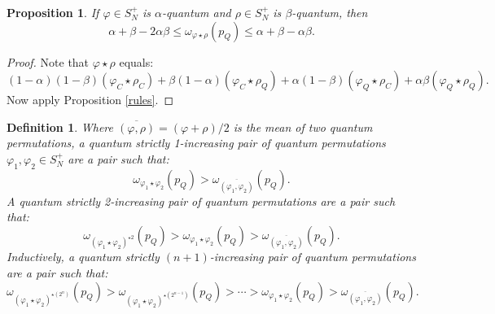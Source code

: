 \documentclass[12pt]{amsart}
\newtheorem{definition}[theorem]{Definition}
\newtheorem{proposition}[theorem]{Proposition}
\theoremstyle{remark}
\theoremstyle{remark}
\begin{document}
\begin{proposition}\label{alphabeta}
If $\varphi\in S_N^+$ is $\alpha$-quantum and $\rho\in S_N^+$ is $\beta$-quantum, then
$$\alpha+\beta-2\alpha\beta\leq \omega_{\varphi\star \rho}(p_Q)\leq \alpha+\beta-\alpha\beta.$$
\end{proposition}
\begin{proof}
Note that $\varphi\star \rho$ equals:
$$(1-\alpha)(1-\beta) (\varphi_C\star \rho_C)+\beta (1-\alpha)(\varphi_C\star \rho_Q)+\alpha(1-\beta)(\varphi_Q\star \rho_C)+\alpha\beta(\varphi_Q\star \rho_Q).$$
Now apply Proposition \ref{rules}.
\end{proof}
\begin{definition}
  Where $\overline{(\varphi,\rho)}=(\varphi+\rho)/2$ is the mean of two quantum permutations, a \emph{quantum strictly 1-increasing} pair of quantum permutations $\varphi_1,\varphi_2\in S_N^+$ are a pair such that:
  $$\omega_{\varphi_1\star\varphi_2}(p_Q)>\omega_{\overline{(\varphi_1,\varphi_2)}}(p_Q).$$
  A \emph{quantum strictly 2-increasing} pair of quantum permutations are a pair such that:
  $$\omega_{(\varphi_1\star\varphi_2)^{\star 2}}(p_Q)>\omega_{\varphi_1\star\varphi_2}(p_Q)>\omega_{\overline{(\varphi_1,\varphi_2)}}(p_Q).$$
  Inductively, a  \emph{quantum strictly $(n+1)$-increasing} pair of quantum permutations are a pair such that:
  $$\omega_{(\varphi_1\star\varphi_2)^{\star (2^n)}}(p_Q)>\omega_{(\varphi_1\star\varphi_2)^{\star \left(2^{n-1}\right)}}(p_Q)>\cdots>\omega_{\varphi_1\star\varphi_2}(p_Q)>\omega_{\overline{(\varphi_1,\varphi_2)}}(p_Q).$$

\end{definition}
\end{document}
